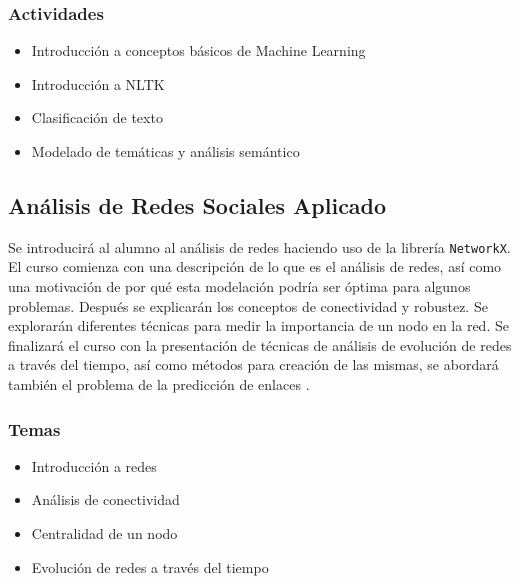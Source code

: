 \documentclass{article}
\begin{document}
            \subsubsection{Actividades}
                    
                \begin{itemize}
                    \item Introducción a conceptos básicos de Machine Learning
                    \item Introducción a NLTK
                    \item Clasificación de texto
                    \item Modelado de temáticas y análisis semántico
                \end{itemize}

        \subsection{Análisis de Redes Sociales Aplicado}

            Se introducirá al alumno al análisis de redes haciendo uso de la librería \texttt{NetworkX}. El curso comienza con una descripción de lo que es el análisis de redes, así como una motivación de por qué esta modelación podría ser óptima para algunos problemas. Después se explicarán los conceptos de conectividad y robustez. Se explorarán diferentes técnicas para medir la importancia de un nodo en la red. Se finalizará el curso con la presentación de técnicas de análisis de evolución de redes a través del tiempo, así como métodos para creación de las mismas, se abordará también el problema de la predicción de enlaces \cite{network-analysis}.

            \subsubsection{Temas}

                \begin{itemize}
                    \item Introducción a redes
                    \item Análisis de conectividad
                    \item Centralidad de un nodo
                    \item Evolución de redes a través del tiempo
                \end{itemize}
        
\end{document}
